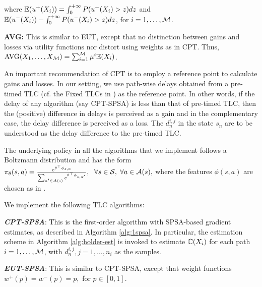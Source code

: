 where $\mathbb{E}(u^+(X_i)) = \int_0^{+\infty} P(u^+(X_i)>z) dz$ and $\mathbb{E}(u^-(X_i)) - \int_0^{+\infty} P(u^-(X_i)>z) dz$, for $i=1,\ldots,\mathcal{M}$.

\textbf{AVG:} This is similar to EUT, except that no distinction between gains and losses via utility functions nor distort using weights as in CPT. Thus, $\text{AVG}(X_1,\ldots,X_{\mathcal{M}}) = \sum_{i=1}^{\mathcal{M}} \mu^i \mathbb{E}(X_i)$. 

An important recommendation of CPT is to employ a reference point to calculate gains and losses. 
In our setting, we use path-wise delays obtained from a pre-timed TLC (cf. the Fixed TLCs in \cite{prashanth2011reinforcement}) as the reference point. In other words, if the delay of any algorithm (say CPT-SPSA) is less than that of pre-timed TLC, then the (positive) difference in delays is perceived as a gain and in the complementary case, the delay difference is perceived as a loss. The $d_n^{i,j}$ in the state $s_n$ are to be understood as the delay difference to the pre-timed TLC.  

The underlying policy in all the algorithms that we implement follows a Boltzmann distribution  and has the form
$
\pi_{\theta}(s,a) = \frac{e^{\theta^{\top} \phi_{s,a}}}{\sum_{a' \in {\mathcal{A}(s)}} e^{\theta^{\top} \phi_{s,a'}}},
\hspace{6pt} \forall s \in \mathcal{S},\;\forall a \in \mathcal{A}(s),
$
where the features $\phi(s,a)$ are chosen as in \cite{prashanth2012threshold}.

We implement the following TLC algorithms:

{\bf\em CPT-SPSA}: This is the first-order algorithm with SPSA-based gradient estimates, as described in Algorithm \ref{alg:1spsa}. In particular, the estimation scheme in Algorithm \ref{alg:holder-est} is invoked to estimate $\mathbb{C}(X_i)$ for each path $i=1,\ldots,\mathcal{M}$, with $d_n^{i,j}, j=1,\ldots,n_i$ as the samples.

{\bf\em EUT-SPSA}: This is similar to CPT-SPSA, except that weight functions $w^+(p)=w^-(p)=p,$ for $p\in [0,1]$. 

